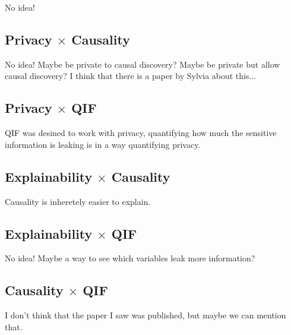 {\color{red} No idea!}

\subsection{Privacy $\times$ Causality}

{\color{red} No idea! Maybe be private to causal discovery? Maybe be private but allow causal discovery? I think that there is a paper by Sylvia about this...}

\subsection{Privacy $\times$ QIF}

{\color{red} QIF was desined to work with privacy, quantifying how much the sensitive information is leaking is in a way quantifying privacy.}

\subsection{Explainability $\times$ Causality}

{\color{red} Causality is inheretely easier to explain.}

\subsection{Explainability $\times$ QIF}

{\color{red} No idea! Maybe a way to see which variables leak more information?}

\subsection{Causality $\times$ QIF}

{\color{red} I don't think that the paper I saw was published, but maybe we can mention that.}

